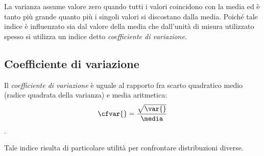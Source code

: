 La varianza assume valore zero quando tutti i valori coincidono con la 
media ed è tanto più grande quanto più i singoli valori
si discostano dalla media. Poiché tale indice è influenzato sia dal valore 
della media che dall'unità di misura utilizzato spesso si utilizza
un indice detto \emph{coefficiente di variazione}.

\subsection{Coefficiente di variazione}
\label{subsec:stat02_coeff_variazione}

\begin{definizione}
Il \emph{coefficiente di variazione} è uguale al rapporto fra scarto 
quadratico medio (radice quadrata
della varianza) e media aritmetica:
\[\cfvar{} = \frac{\sqrt{\var{}}}{\media}\].
\end{definizione}
Tale indice risulta di particolare utilità per confrontare distribuzioni 
diverse.

